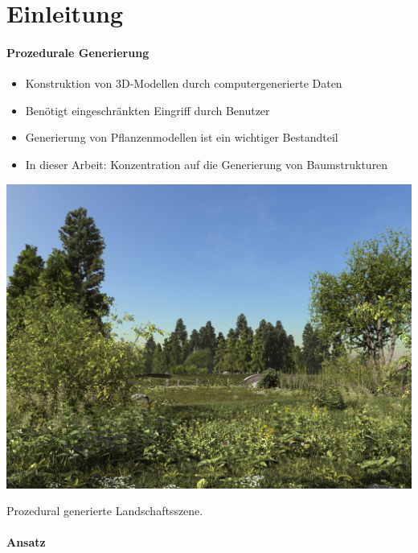 \newpage
{}
\section{Einleitung \\}
\paragraph{Prozedurale Generierung\\}
\begin{itemize}
	\item Konstruktion von 3D-Modellen durch computergenerierte Daten
	\item Benötigt eingeschränkten Eingriff durch Benutzer
	\item Generierung von Pflanzenmodellen ist ein wichtiger Bestandteil
	\item In dieser Arbeit: Konzentration auf die Generierung von Baumstrukturen
\end{itemize}

\newpage
{}
\begin{center}
	\includegraphics[height=.9\textheight]{images/CH1_greenXfrog_JanWalterSchliep.jpg}	
	
	Prozedural generierte Landschaftsszene. \cite{GreenOne:16}
\end{center}

\newpage
{}
\paragraph{Ansatz\\}

